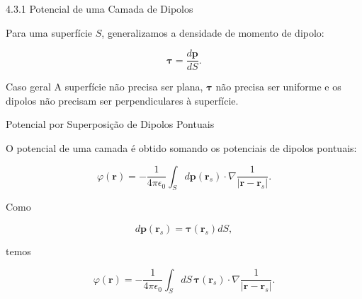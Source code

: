 \documentclass[aspectratio=169]{beamer}
\begin{document}
\begin{frame}{4.3.1 Potencial de uma Camada de Dipolos}

Para uma superfície \(S\), generalizamos a densidade de momento de dipolo:

\begin{eqbox}
\begin{equation}
\boldsymbol{\tau}
=
\frac{d\mathbf p}{dS}.
\tag{4.34}
\label{eq:4.34}
\end{equation}
\end{eqbox}

\begin{mybox}{Caso geral}
A superfície não precisa ser plana, \(\boldsymbol{\tau}\) não precisa ser uniforme e os dipolos não precisam ser perpendiculares à superfície.
\end{mybox}

\end{frame}

\begin{frame}{Potencial por Superposição de Dipolos Pontuais}

O potencial de uma camada é obtido somando os potenciais de dipolos pontuais:

\begin{eqbox}
\begin{equation}
\varphi(\mathbf r)
=
-\frac{1}{4\pi\epsilon_0}
\int_S
d\mathbf p(\mathbf r_s)\cdot
\nabla
\frac{1}{|\mathbf r-\mathbf r_s|}.
\tag{4.35a}
\label{eq:4.35a}
\end{equation}
\end{eqbox}

Como

\[
d\mathbf p(\mathbf r_s)=\boldsymbol{\tau}(\mathbf r_s)dS,
\]

temos

\begin{eqbox}
\begin{equation}
\varphi(\mathbf r)
=
-\frac{1}{4\pi\epsilon_0}
\int_S
dS\,
\boldsymbol{\tau}(\mathbf r_s)\cdot
\nabla
\frac{1}{|\mathbf r-\mathbf r_s|}.
\tag{4.35}
\label{eq:4.35}
\end{equation}
\end{eqbox}

\end{frame}
\end{document}
